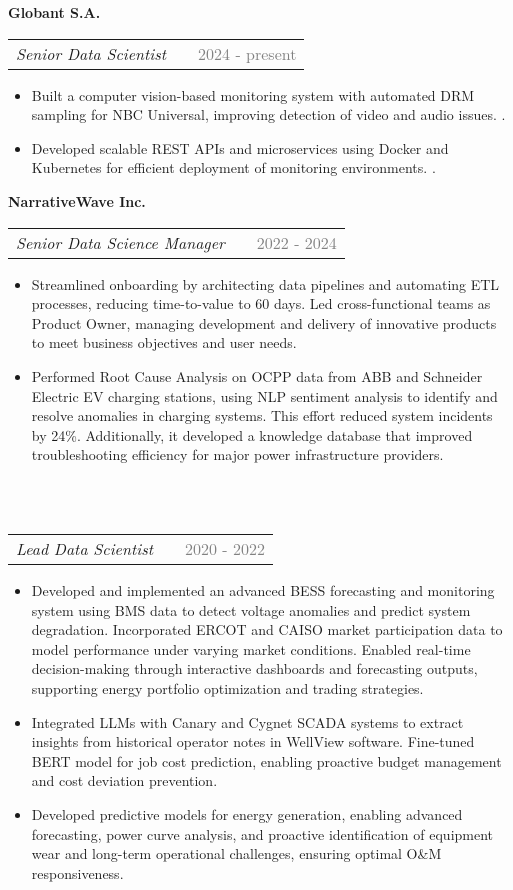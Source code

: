 \documentclass[a4paper,12pt]{article}
\makeatletter
\newenvironment{joblong}[3]
    {
    \noindent\textbf{\large #1}\\ %
    \begin{tabularx}{\linewidth}{@{}l X r@{}}
    \textit{#2} & &  {\textcolor{gray}{#3}} \\[3.75pt] %
    \end{tabularx}
    \begin{minipage}[t]{\linewidth}
    \begin{itemize}[nosep,after=\strut, leftmargin=1em, itemsep=3pt,label=--]
    }
    {
    \end{itemize}
    \end{minipage}    
    }
\makeatother
\begin{document}
\begin{joblong}{Globant S.A. }{Senior Data Scientist}{2024 - present}
    \item Built a computer vision-based monitoring system with automated DRM sampling for NBC Universal, improving detection of video and audio issues.    .
    \item Developed scalable REST APIs and microservices using Docker and Kubernetes for efficient deployment of monitoring environments.    .
\end{joblong}

\begin{joblong}{NarrativeWave Inc.}{Senior Data Science Manager}{2022 - 2024}
    \item Streamlined onboarding by architecting data pipelines and automating ETL processes, reducing time-to-value to 60 days. Led cross-functional teams as Product Owner, managing development and delivery of innovative products to meet business objectives and user needs.
    \item Performed Root Cause Analysis on OCPP data from ABB and Schneider Electric EV charging stations, using NLP sentiment analysis to identify and resolve anomalies in charging systems. This effort reduced system incidents by 24\%. Additionally, it developed a knowledge database that improved troubleshooting efficiency for major power infrastructure providers.
\end{joblong}
\\
\begin{joblong}{}{Lead Data Scientist}{2020 - 2022}
    \item Developed and implemented an advanced BESS forecasting and monitoring system using BMS data to detect voltage anomalies and predict system degradation. Incorporated ERCOT and CAISO market participation data to model performance under varying market conditions. Enabled real-time decision-making through interactive dashboards and forecasting outputs, supporting energy portfolio optimization and trading strategies.
    \item Integrated LLMs with Canary and Cygnet SCADA systems to extract insights from historical operator notes in WellView software. Fine-tuned BERT model for job cost prediction, enabling proactive budget management and cost deviation prevention.
    \item Developed predictive models for energy generation, enabling advanced forecasting, power curve analysis, and proactive identification of equipment wear and long-term operational challenges, ensuring optimal O\&M responsiveness. 
\end{joblong}
\end{document}
